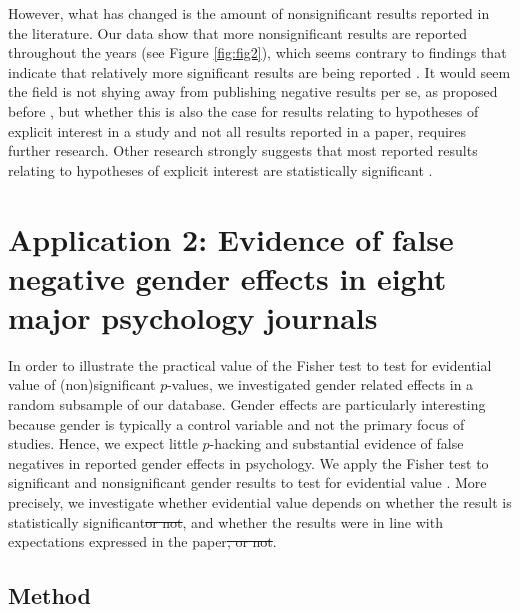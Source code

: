 \documentclass{article}
\providecommand{\DIFaddtex}[1]{{\protect\color{blue}\uwave{#1}}} %
\providecommand{\DIFdeltex}[1]{{\protect\color{red}\sout{#1}}}                      %
\providecommand{\DIFaddbegin}{} %
\providecommand{\DIFaddend}{} %
\providecommand{\DIFdelbegin}{} %
\providecommand{\DIFdelend}{} %
\providecommand{\DIFadd}[1]{\texorpdfstring{\DIFaddtex{#1}}{#1}} %
\providecommand{\DIFdel}[1]{\texorpdfstring{\DIFdeltex{#1}}{}} %
\begin{document}
However, what has changed is the amount of nonsignificant results reported in the literature. Our data show that more nonsignificant results are reported throughout the years (see Figure \ref{fig:fig2}), which seems contrary to findings that indicate that relatively more significant results are being reported \cite{Fanelli2011-xa, Sterling1995-fe, Sterling1959-pf,De_Winter2015-ru}. It would seem the field is not shying away from publishing negative results per se, as proposed before \cite{Fanelli2011-xa,Greenwald1975-ck,Nosek2012-aw,Rosenthal1979-lx,Schimmack2012-du}, but whether this is also the case for results relating to hypotheses of explicit interest in a study and not all results reported in a paper, requires further research. Other research strongly suggests that most reported results relating to hypotheses of explicit interest are statistically significant \cite{Open_Science_Collaboration2015-zs}.

\section*{Application 2: Evidence of false negative gender effects in eight major psychology journals}

In order to illustrate the practical value of the Fisher test to test for evidential value of (non)significant $p$-values, we investigated gender related effects in a random subsample of our database. Gender effects are particularly interesting because gender is typically a control variable and not the primary focus of studies. Hence, we expect little $p$-hacking and substantial evidence of false negatives in reported gender effects in psychology. We apply the Fisher test to significant and nonsignificant gender results to test for evidential value \cite{Van_Assen2015-gg,Simonsohn2014-dm}. More precisely, we investigate whether evidential value depends on whether \DIFaddbegin \DIFadd{or not }\DIFaddend the result is statistically significant\DIFdelbegin \DIFdel{or not}\DIFdelend , and whether \DIFaddbegin \DIFadd{or not }\DIFaddend the results were in line with expectations expressed in the paper\DIFdelbegin \DIFdel{, or not}\DIFdelend .

\subsection*{Method}
\end{document}
